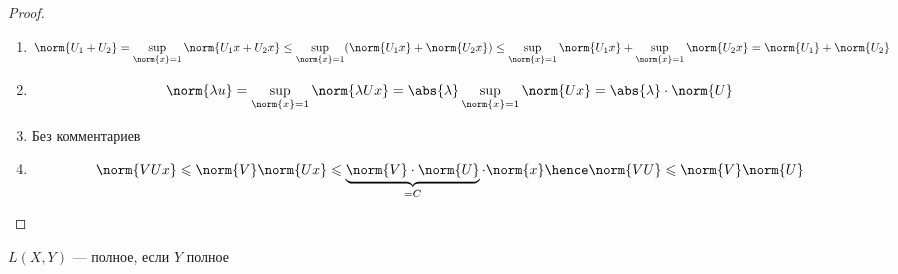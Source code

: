 \begin{proof}
   \begin{enumerate}
       \item 
       \[
           \norm{U_1 + U_2} = \sup_{\norm{x} = 1}\norm{U_1x + U_2x} \le
           \sup_{\norm{x}=1}(\norm{U_1 x} + \norm{U_2 x}) \le
           \sup_{\norm{x}=1}\norm{U_1 x} + \sup_{\norm{x} = 1}\norm{U_2 x} = \norm{U_1} + \norm{U_2}
       \]
       \item \[
           \norm{\lambda u} = \sup_{\norm{x} = 1} {\norm{\lambda Ux}} = \abs{\lambda} \sup_{\norm{x} = 1}{\norm{Ux}} = \abs{\lambda} \cdot \norm{U}
       \]

       \item Без комментариев
       
       \item \[
           \norm{VUx} \leqslant \norm{V} \norm{Ux} \leqslant \underbrace{\norm{V} \cdot \norm{U} }_{ = C}  \cdot \norm{x} \hence \norm{VU} \leqslant \norm{V} \norm{U}
       \]
   \end{enumerate} 
        

\end{proof}



\begin{theorem}
    $L(X, Y)$ --- полное, если $Y$ полное
\end{theorem}


